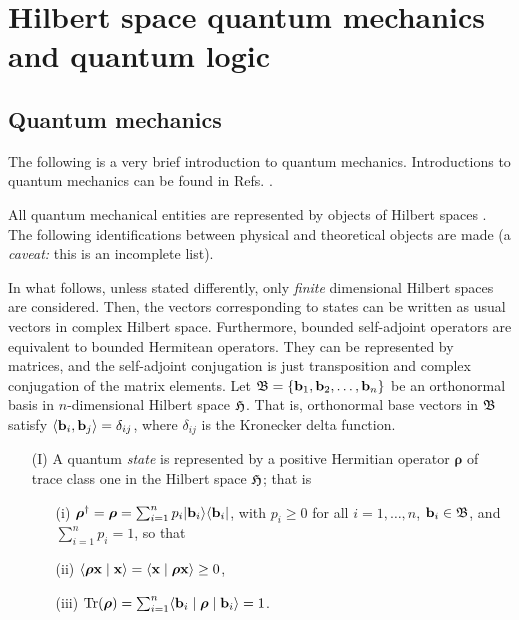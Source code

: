 {\color{Purple}

\chapter{Hilbert space quantum mechanics and quantum logic}

\section{Quantum mechanics}

The following is a very brief introduction to quantum mechanics.
Introductions to quantum mechanics can be found in
Refs. \cite{feynman-III,ba-89,messiah-61,peres,wheeler-Zurek:83}.

All quantum
mechanical entities are represented by objects
of Hilbert spaces \cite{v-neumann-49,birkhoff-36}.
The following identifications between physical and theoretical objects
are made (a {\it caveat:} this is an incomplete list).

In what follows, unless stated differently, only
{\em finite} dimensional Hilbert spaces are considered.
 Then, the vectors
corresponding to states can be written as usual vectors in complex
Hilbert space.
Furthermore, bounded
self-adjoint operators are  equivalent to bounded Hermitean operators.
They can be represented by matrices, and the self-adjoint
conjugation
is just transposition and complex conjugation of the matrix elements.
Let ${\frak B}=\{{\bf b}_1,{\bf b}_2,\ldots , {\bf b}_n\}$ be an orthonormal basis in $n$-dimensional Hilbert space ${\frak H}$.
That is,  orthonormal base vectors in ${\frak B}$
satisfy
$\langle {\bf b}_i, {\bf b}_j\rangle =\delta_{ij}$,
where $\delta_{ij}$ is the Kronecker delta function.

\begin{itemize}
\item[(I)]
 A quantum {\em   state} is represented by
a  positive Hermitian operator  ${    {\boldsymbol{\rho}}}$
of trace class one in  the Hilbert space ${\frak H} $;
that is
\begin{itemize}
\item[(i)]
 ${    {\boldsymbol{\rho}}}^\dagger ={    {\boldsymbol{\rho}}}=\sum_{i=1}^n p_i  \vert {\bf b}_i \rangle \langle {\bf b}_i  \vert $,
    with  $p_i\ge 0$ for all $i=1,\ldots , n$, ${\bf b}_i \in {\frak B}$, and $\sum_{i=1}^n p_i =1$, so that
\item[(ii)]
$\langle {    {\boldsymbol{\rho}}}{\bf x}\mid {\bf x}\rangle =\langle {\bf x}\mid {    {\boldsymbol{\rho}}}{\bf x}\rangle  \ge 0$,
\item[(iii)]
$\textrm{Tr}( {    {\boldsymbol{\rho}}})=\sum_{i=1}^n \langle {\bf b}_i \mid {    {\boldsymbol{\rho}}} \mid  {\bf b}_i \rangle =1 $.
\end{itemize}


\end{itemize}}
